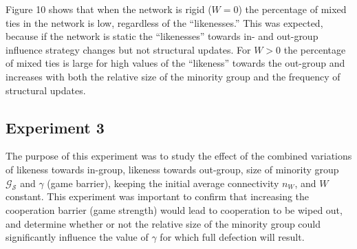 Figure 10 shows that when the network is rigid ($ W = 0 $) the percentage of mixed ties in the network is low, regardless of the ``likenesses.'' This was expected, because if the network is static the ``likenesses'' towards in- and out-group influence strategy changes but not structural updates. For $ W > 0 $ the percentage of mixed ties is large for high values of the ``likeness'' towards the out-group and increases with both the relative size of the minority group and the frequency of structural updates. 

\subsection{Experiment 3}
The purpose of this experiment was to study the effect of the combined variations of likeness towards in-group, likeness towards out-group, size of minority group $ \mathcal{G}_{\mathcal{S}} $ and $ \gamma $ (game barrier), keeping the initial average connectivity $ n_{W} $, and  $ W $ constant. This experiment was important to confirm that increasing the cooperation barrier (game strength) would lead to cooperation to be wiped out, and determine whether or not the relative size of the minority group could significantly influence the value of $ \gamma $ for which full defection will result.

